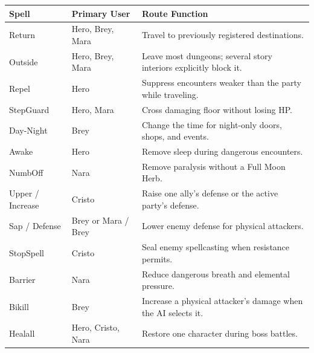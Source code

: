 \documentclass[
  american,
  10pt,
  letterpaper,
  oneside,
  open=any]{scrreprt}
\newcounter{none} %
\newenvironment{guidetable}{%
  \small\setstretch{1.0}%
  \setlength{\tabcolsep}{4pt}%
  \setlength{\LTpre}{8pt}\setlength{\LTpost}{10pt}%
  \renewcommand{\arraystretch}{1.16}%
}{ }
\begin{document}
\begin{guidetable}

{\def\LTcaptype{none} %
\begin{longtable}[]{@{}
  >{\raggedright\arraybackslash}p{}
  >{\raggedright\arraybackslash}p{}
  >{\raggedright\arraybackslash}p{}@{}}
\toprule\noalign{}
\begin{minipage}[b]{\linewidth}\raggedright
\color{GuideGreen}\bfseries Spell
\end{minipage} & \begin{minipage}[b]{\linewidth}\raggedright
\color{GuideGreen}\bfseries Primary User
\end{minipage} & \begin{minipage}[b]{\linewidth}\raggedright
\color{GuideGreen}\bfseries Route Function
\end{minipage} \\
\midrule\noalign{}
\endhead
\bottomrule\noalign{}
\endlastfoot
Return & Hero, Brey, Mara & Travel to previously registered
destinations. \\
Outside & Hero, Brey, Mara & Leave most dungeons; several story
interiors explicitly block it. \\
Repel & Hero & Suppress encounters weaker than the party while
traveling. \\
StepGuard & Hero, Mara & Cross damaging floor without losing HP. \\
Day-Night & Brey & Change the time for night-only doors, shops, and
events. \\
Awake & Hero & Remove sleep during dangerous encounters. \\
NumbOff & Nara & Remove paralysis without a Full Moon Herb. \\
Upper / Increase & Cristo & Raise one ally's defense or the active
party's defense. \\
Sap / Defense & Brey or Mara / Brey & Lower enemy defense for physical
attackers. \\
StopSpell & Cristo & Seal enemy spellcasting when resistance permits. \\
Barrier & Nara & Reduce dangerous breath and elemental pressure. \\
Bikill & Brey & Increase a physical attacker's damage when the AI
selects it. \\
Healall & Hero, Cristo, Nara & Restore one character during boss
battles. \\

\end{longtable}}
\end{guidetable}
\end{document}
